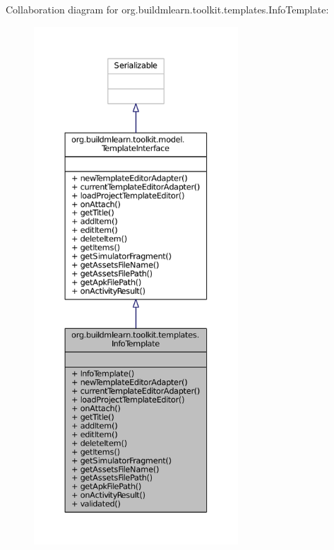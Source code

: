 Collaboration diagram for org.\-buildmlearn.\-toolkit.\-templates.\-Info\-Template\-:
\nopagebreak
\begin{figure}[H]
\begin{center}
\leavevmode
\includegraphics[height=550pt]{d7/dfb/classorg_1_1buildmlearn_1_1toolkit_1_1templates_1_1InfoTemplate__coll__graph}
\end{center}
\end{figure}
